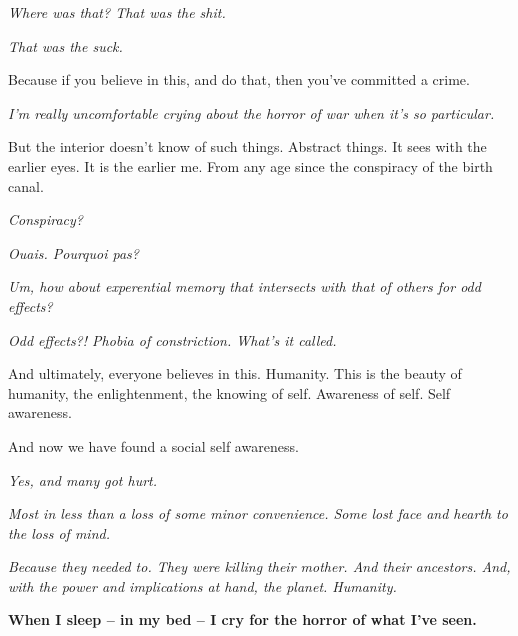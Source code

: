 

{\it Where was that?  That was the shit.}

{\it That was the suck.}

Because if you believe in this, and do that, then you've committed a
crime.  

{\it I'm really uncomfortable crying about the horror of war when it's so
particular.}

But the interior doesn't know of such things.  Abstract things.  It
sees with the earlier eyes.  It is the earlier me.  From any age since
the conspiracy of the birth canal.

{\it Conspiracy?}

{\it Ouais.  Pourquoi pas?}

{\it Um, how about experential memory that intersects with that of others
for odd effects?}

{\it Odd effects?!  Phobia of constriction.  What's it called.}

And ultimately, everyone believes in this.  Humanity.  This is the
beauty of humanity, the enlightenment, the knowing of self.  Awareness
of self. Self awareness.

And now we have found a social self awareness. 

{\it Yes, and many got hurt.  }

{\it Most in less than a loss of some minor convenience.  Some lost face
and hearth to the loss of mind.}

{\it Because they needed to.  They were killing their mother.  And their
ancestors.  And, with the power and implications at hand, the planet.
Humanity.}

{\bf When I sleep -- in my bed -- I cry for the horror of what I've seen.}

\bye
